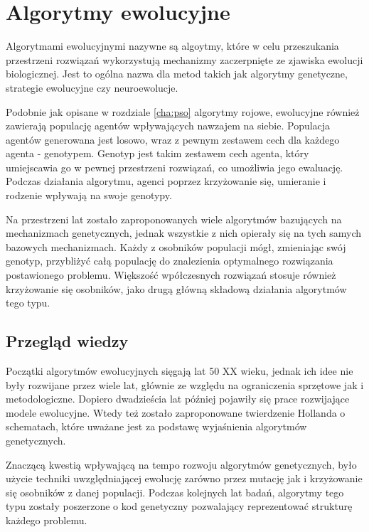 \chapter{Algorytmy ewolucyjne}
\label{cha:genetyczne}

Algorytmami ewolucyjnymi nazywne są algoytmy, które w celu przeszukania przestrzeni rozwiązań  wykorzystują mechanizmy zaczerpnięte ze zjawiska ewolucji biologicznej. Jest to ogólna nazwa dla metod takich jak algorytmy genetyczne, strategie ewolucyjne czy neuroewolucje. 

Podobnie jak opisane w rozdziale \ref{cha:pso} algorytmy rojowe, ewolucyjne również zawierają populację agentów wpływających nawzajem na siebie. Populacja agentów generowana jest losowo, wraz z pewnym zestawem cech dla każdego agenta - genotypem. Genotyp jest takim zestawem cech agenta, który umiejscawia go w pewnej przestrzeni rozwiązań, co umożliwia jego ewaluację. Podczas działania algorytmu, agenci poprzez krzyżowanie się, umieranie i rodzenie wpływają na swoje genotypy. 

Na przestrzeni lat zostało zaproponowanych wiele algorytmów bazujących na mechanizmach genetycznych, jednak wszystkie z nich opierały się na tych samych bazowych mechanizmach. Każdy z osobników populacji mógł, zmieniając swój genotyp, przybliżyć całą populację do znalezienia optymalnego rozwiązania postawionego problemu. Większość wpółczesnych rozwiązań stosuje również krzyżowanie się osobników, jako drugą główną składową działania algorytmów tego typu.

\section{Przegląd wiedzy}
\label{sec:historiagenetycznych}
Początki algorytmów ewolucyjnych sięgają lat 50 XX wieku\cite{GA1}, jednak ich idee nie były rozwijane przez wiele lat, głównie ze względu na ograniczenia sprzętowe jak i metodologiczne. Dopiero dwadzieścia lat później\cite{GA2} pojawiły się prace rozwijające modele ewolucyjne. Wtedy też zostało zaproponowane twierdzenie Hollanda o schematach, które uważane jest za podstawę wyjaśnienia algorytmów genetycznych. 

Znaczącą kwestią wpływającą na tempo rozwoju algorytmów genetycznych, było użycie techniki uwzględniającej ewolucję zarówno przez mutację jak i krzyżowanie się osobników z danej populacji. Podczas kolejnych lat badań, algorytmy tego typu zostały poszerzone o kod genetyczny pozwalający reprezentować strukturę każdego problemu.

